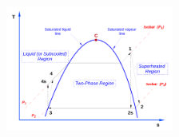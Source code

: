 \documentclass[10pt,compress,handout,ignorenonframetext]{beamer}
\begin{document}
\begin{frame}
\begin{columns}
\begin{column}[c]{0.5\linewidth}
{           \vspace{-0.1cm}
           \hbox{\hspace{.5cm}\includegraphics[width=5.5cm,clip]{./Pics/Ideal_Real_Rankine}}
         }
      \end{column}
   \end{columns}
 \normalsize
\end{frame}

\end{document}
